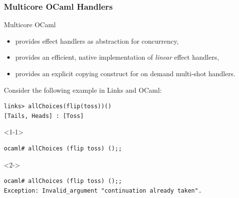 \documentclass[10pt,compress]{beamer}
\begin{document}
\begin{frame}[fragile]
  \frametitle{Multicore OCaml Handlers}
%
Multicore OCaml
\begin{itemize}
\item provides effect handlers as abstraction for concurrency,
\item provides an efficient, native implementation of \emph{linear} effect handlers,
\item provides an explicit copying construct for on demand multi-shot handlers.
\end{itemize}

Consider the following example in Links and OCaml:
\begin{lstlisting}[style=terminal]
links> allChoices(flip(toss))()
[Tails, Heads] : [Toss]  
\end{lstlisting}      

\begin{onlyenv}<1-1>    
\begin{lstlisting}[style=terminal]
ocaml# allChoices (flip toss) ();;

\end{lstlisting}
\end{onlyenv}
%
\begin{onlyenv}<2->    
\begin{lstlisting}[style=terminal]
ocaml# allChoices (flip toss) ();;
Exception: Invalid_argument "continuation already taken".
\end{lstlisting}
\end{onlyenv}





\end{frame}
\end{document}
